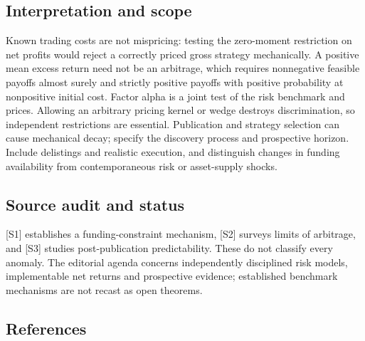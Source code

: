 \documentclass[11pt,a4paper]{article}
\begin{document}
\subsection*{Interpretation and scope}
Known trading costs are not mispricing: testing the zero-moment restriction on net profits would reject a correctly priced gross strategy mechanically. A positive mean excess return need not be an arbitrage, which requires nonnegative feasible payoffs almost surely and strictly positive payoffs with positive probability at nonpositive initial cost. Factor alpha is a joint test of the risk benchmark and prices. Allowing an arbitrary pricing kernel or wedge destroys discrimination, so independent restrictions are essential. Publication and strategy selection can cause mechanical decay; specify the discovery process and prospective horizon. Include delistings and realistic execution, and distinguish changes in funding availability from contemporaneous risk or asset-supply shocks.

\subsection*{Source audit and status}
[S1] establishes a funding-constraint mechanism, [S2] surveys limits of arbitrage, and [S3] studies post-publication predictability. These do not classify every anomaly. The editorial agenda concerns independently disciplined risk models, implementable net returns and prospective evidence; established benchmark mechanisms are not recast as open theorems.

\subsection*{References}
\end{document}
